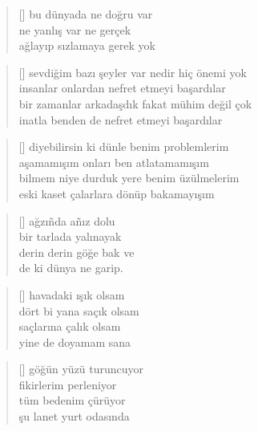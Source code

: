 \documentclass[a5paper, openright, twoside]{memoir}
\begin{document}
\begin{verse}[\versewidth]
  bu dünyada ne doğru var \\
  ne yanlış var ne gerçek \\
  ağlayıp sızlamaya gerek yok
\end{verse}
\begin{verse}[\versewidth]
  sevdiğim bazı şeyler var nedir hiç önemi yok \\
  insanlar onlardan nefret etmeyi başardılar \\
  bir zamanlar arkadaşdık fakat mühim değil çok \\
  inatla benden de nefret etmeyi başardılar
\end{verse}
\begin{verse}[\versewidth]
  diyebilirsin ki dünle benim problemlerim \\
  aşamamışım onları ben atlatamamışım \\
  bilmem niye durduk yere benim üzülmelerim \\
  eski kaset çalarlara dönüp bakamayışım
\end{verse}
\begin{verse}[\versewidth]
  ağzı\~nda a\~nız dolu  \\
  bir tarlada yalınayak  \\
  derin derin göğe bak ve  \\
  de ki dünya ne garip.
\end{verse}
\begin{verse}[\versewidth]
  havadaki ışık olsam \\
  dört bi yana saçık olsam \\
  saçlarına çalık olsam \\
  yine de doyamam sana
\end{verse}
\begin{verse}[\versewidth]
  göğün yüzü turuncuyor \\
  fikirlerim perleniyor \\
  tüm bedenim çürüyor \\
  şu lanet yurt odasında
\end{verse}
\end{document}
